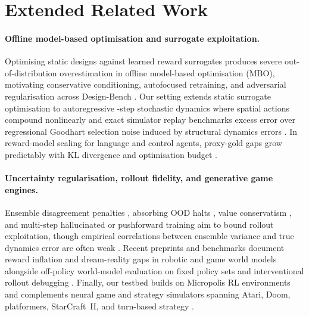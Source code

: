 \section{Extended Related Work}\label{app:morerelated}

\paragraph{Offline model-based optimisation and surrogate exploitation.}
Optimising static designs against learned reward surrogates produces severe out-of-distribution overestimation in offline model-based optimisation (MBO), motivating conservative conditioning, autofocused retraining, and adversarial regularisation across Design-Bench \citep{brookes2019cbas,fannjiang2020autofocused,kumar2020mins,trabucco2021coms,trabucco2022designbench}. Our setting extends static surrogate optimisation to autoregressive \Horizon-step stochastic dynamics where spatial actions compound nonlinearly and exact simulator replay benchmarks excess error over regressional Goodhart selection noise \citep{manheim2018goodhart,bailey2017pbo,ma2026selectiontax,bastani2026winners,eshwar2026proofcarrying} induced by structural dynamics errors \citep{pan2022misspecification,skalse2022gaming,jakobi1995noise,koos2013transferability}. In reward-model scaling for language and control agents, proxy-gold gaps grow predictably with KL divergence and optimisation budget \citep{gao2023scaling,frick2024ppe,kim2025rethinking,wen2025rethinking}.

\paragraph{Uncertainty regularisation, rollout fidelity, and generative game engines.}
Ensemble disagreement penalties \citep{kurutach2018metrpo,chua2018pets,yu2020mopo}, absorbing OOD halts \citep{kidambi2020morel}, value conservatism \citep{yu2021combo,rigter2022rambo}, and multi-step hallucinated or pushforward training \citep{talvitie2014regularization,talvitie2017selfcorrecting,venkatraman2015dad,brandstetter2022mpnpde} aim to bound rollout exploitation, though empirical correlations between ensemble variance and true dynamics error are often weak \citep{lu2022revisiting}. Recent preprints and benchmarks document reward inflation and dream-reality gaps in robotic and game world models \citep{jiang2026wovr,zhou2026wovrplus,khassanov2026lies,kieto2026moba,bhamidipaty2026renew,amd2026learningtofail,xu2026curewm,yang2026mirabench,reka2026worldmodelgym,kong2026tif,guzel2026prowl,odyssey2026prowl1} alongside off-policy world-model evaluation on fixed policy sets \citep{fu2021dope,zhang2021autoregressive} and interventional rollout debugging \citep{yao2026rolloutfaith,rahmani2026debugging,zhu2026dualfrontier,vakalis2026intervention}. Finally, our testbed builds on Micropolis RL environments \citep{earle2020gymcity} and complements neural game and strategy simulators spanning Atari, Doom, platformers, StarCraft~II, and turn-based strategy \citep{kaiser2020simple,micheli2023iris,alonso2024diamond,valevski2025gamengen,bruce2024genie,synnaeve2018defogger,egorov2022mamba,bamford2020nge,dyer2024interventionally,zhang2024marie,zhang2026starwm,li2026civworldbench}.

